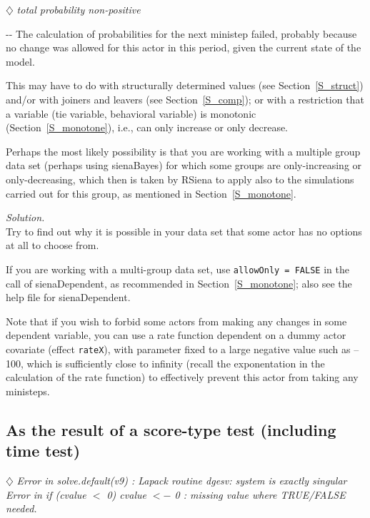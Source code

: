 \documentclass[a4paper,fleqn,11pt]{article}
\makeatletter
\newcommand{\+}{\, + \,}
\newcommand{\sfn}[1]{\textsf{#1}}
\newcommand{\RS}{{\sf RSiena }}
\newenvironment{indentation}[2]
{\par \setlength{\leftmargin}{#1}       \setlength{\rightmargin}{#2}
  \advance\linewidth -\leftmargin       \advance\linewidth -\rightmargin
  \advance\@totalleftmargin\leftmargin  \@setpar{{\@@par}}%
  \parshape 1 \@totalleftmargin         \linewidth \ignorespaces}{\par}
\makeatother
\begin{document}
\noindent $\diamondsuit$ \emph{total probability non-positive}\\
\smallskip

\begin{indentation}{0.04\textwidth}{0pt}
\noindent
The calculation of probabilities for the next ministep failed,
probably because no change was allowed for this actor in this period,
given the current state of the model.

This may have to do with structurally determined values
(see Section~\ref{S_struct})
and/or with joiners and leavers (see Section~\ref{S_comp});
or with a restriction that a variable (tie variable, behavioral variable)
is monotonic (Section~\ref{S_monotone}), i.e., can only
increase or only decrease.

Perhaps the most likely possibility is that you are working with a
multiple group data set (perhaps using \sfn{sienaBayes})
for which some groups are only-increasing or only-decreasing,
which then is taken by \RS to apply also to the simulations carried
out for this group, as mentioned in Section~\ref{S_monotone}.
\smallskip

\noindent
\emph{Solution.} \\
Try to find out why it is possible in your data set
that some actor has no options at all to choose from.

If you are working with a multi-group data set, use
\texttt{allowOnly = FALSE} in the call of \sfn{sienaDependent},
as recommended in Section~\ref{S_monotone}; also see the help file for
\sfn{sienaDependent}.

Note that if you wish to forbid some actors from making any changes
in some dependent variable, you can use a rate function dependent
on a dummy actor covariate (effect \texttt{rateX}), with parameter fixed
to a large negative value such as --100, which is sufficiently close to
infinity (recall the exponentation in the calculation of the rate function)
to effectively prevent this actor from taking any ministeps.
\end{indentation}
\bigskip




\subsection{As the result of a score-type test (including time test)}

$\diamondsuit$
\emph{Error in solve.default(v9) :
   Lapack routine dgesv: system is exactly singular\\
Error in if (cvalue $<$ 0) cvalue $<-$ 0 :
   missing value where TRUE/FALSE needed.}
\smallskip
\end{document}
